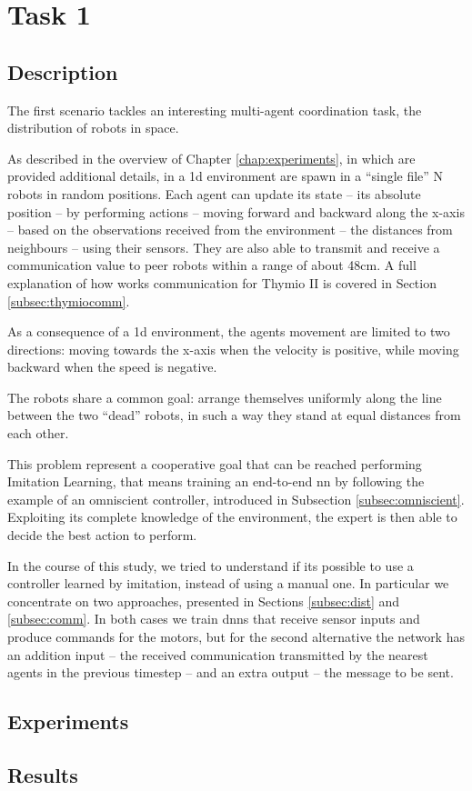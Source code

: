 \section{Task 1}
\label{sec:task1}

\subsection{Description}
\label{subsec:desc1}

The first scenario tackles an interesting multi-agent coordination task, the 
distribution of robots in space.

As described in the overview of Chapter \ref{chap:experiments}, in which are 
provided additional details, in a \gls{1d} environment are spawn in a ``single 
file'' 
N robots in random positions. %
Each agent can update its state – its absolute position – by performing 
actions – 
moving forward and backward along the x-axis – based on the observations 
received from the environment – the distances from neighbours – using their 
sensors.  They are also able to transmit and receive a communication value to 
peer 
robots within a range of about 48\gls{cm}. 
A full explanation of how works communication for Thymio II is covered in 
Section 
\ref{subsec:thymiocomm}.

As a consequence of a \gls{1d} environment, the agents movement are 
limited to 
two directions: moving towards the x-axis when the velocity is positive, 
while 
moving backward when the speed is negative. 

The robots share a common goal: arrange themselves uniformly along the 
line 
between the two ``dead'' robots, in such a way they stand at equal distances 
from 
each other.


This problem represent a cooperative goal that can be reached performing 
Imitation Learning, that means training an end-to-end \gls{nn} by following 
the 
example of an omniscient controller, introduced in Subsection 
\ref{subsec:omniscient}. 
Exploiting its complete knowledge of the environment, %
the expert is then able to decide the best action to perform.

In the course of this study, we tried to understand if its possible to use a 
controller 
learned by imitation, instead of using a manual one. In particular we 
concentrate on two approaches, presented in Sections \ref{subsec:dist} and 
\ref{subsec:comm}.
In both cases we train \glspl{dnn} that receive sensor inputs and produce 
commands for the motors, but for the second alternative the 
network has an addition input – the received communication transmitted by 
the nearest agents in the previous timestep – and an extra output – the message 
to be sent.

\subsection{Experiments}
\label{subsec:ex1}

\subsection{Results}
\label{subsec:results1}


